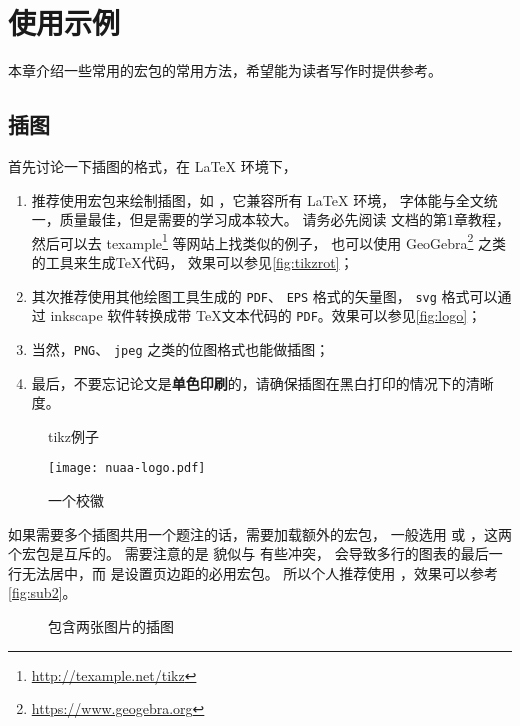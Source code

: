 \chapter{使用示例}

本章介绍一些常用的宏包的常用方法，希望能为读者写作时提供参考。

\section{插图}

首先讨论一下插图的格式，在 \LaTeX{} 环境下，
\begin{enumerate}
\item 推荐使用宏包来绘制插图，如 ，它兼容所有 \LaTeX{} 环境，
字体能与全文统一，质量最佳，但是需要的学习成本较大。
请务必先阅读  文档的第1章教程，
然后可以去 texample\footnote{\url{http://texample.net/tikz}} 等网站上找类似的例子，
也可以使用 GeoGebra\footnote{\url{https://www.geogebra.org}} 之类的工具来生成\TeX 代码，
效果可以参见\autoref{fig:tikzrot}；
\item 其次推荐使用其他绘图工具生成的 \verb|PDF|、 \verb|EPS| 格式的矢量图，
\verb|svg| 格式可以通过 inkscape 软件转换成带 \TeX{}文本代码的 \verb|PDF|。效果可以参见\autoref{fig:logo}；
\item 当然，\verb|PNG|、 \verb|jpeg| 之类的位图格式也能做插图；
\item 最后，不要忘记论文是\textbf{单色印刷}的，请确保插图在黑白打印的情况下的清晰度。
\end{enumerate}

\begin{figure}[htb]
  \setcounter{density}{20}
  
  \caption{tikz例子}
  \label{fig:tikzrot}
\end{figure}

\begin{figure}[htb]
  \texttt{[image: nuaa-logo.pdf]}
  \caption{一个校徽}
  \label{fig:logo}
\end{figure}

如果需要多个插图共用一个题注的话，需要加载额外的宏包，
一般选用  或 ，这两个宏包是互斥的。
需要注意的是  貌似与  有些冲突，
会导致多行的图表的最后一行无法居中，而  是设置页边距的必用宏包。
所以个人推荐使用  ，效果可以参考\autoref{fig:sub2}。

\begin{figure}[htb]
  \quad
  \caption{包含两张图片的插图}
  \label{fig:subfigs}
\end{figure}

